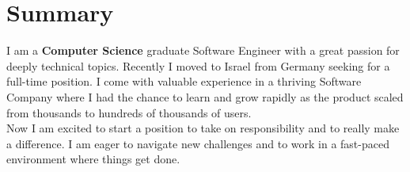 \documentclass{style/modernsimplecv}
\begin{document}
\subsection*{}
\vspace{-3.5em}
\begin{minipage}{0.99\textwidth}
\section*{Summary}
    I am a \textbf{Computer Science} graduate Software Engineer with a great passion for deeply technical topics. Recently I moved to Israel from Germany seeking for a full-time position. I come with valuable experience in a thriving Software Company where I had the chance to learn and grow rapidly as the product scaled from thousands to hundreds of thousands of users.\\
    Now I am excited to start a position to take on responsibility and to really make a difference. I am eager to navigate new challenges and to work in a fast-paced environment where things get done.
\end{minipage}
\bigskip
\end{document}
